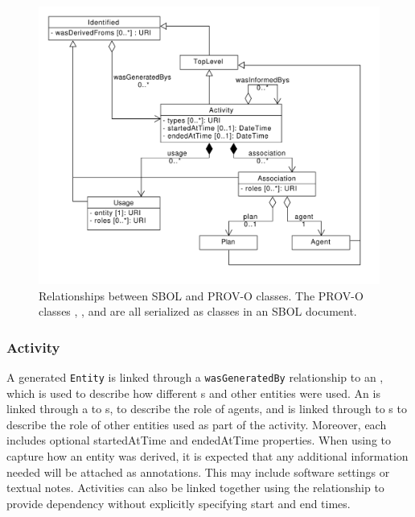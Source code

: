 \begin{figure}[ht]
\begin{center}
\includegraphics[scale=0.6]{uml/provenance}
\caption[]{Relationships between SBOL and PROV-O classes. The PROV-O classes , , and  are all serialized as  classes in an SBOL document.
\label{uml:provenance}}
\end{center}
\end{figure}

\subsubsection{Activity}
\label{sec:Activity}

A generated \texttt{Entity} is linked through a \texttt{wasGeneratedBy} relationship to an , which is used to describe how different s and other entities were used. An  is linked through a  to s, to describe the role of agents, and is linked through  to s to describe the role of other entities used as part of the activity. Moreover, each  includes optional startedAtTime and endedAtTime properties. When using  to capture how an entity was derived, it is expected that any additional information needed will be attached as annotations. This may include software settings or textual notes. Activities can also be linked together using the  relationship to provide dependency without explicitly specifying start and end times.


